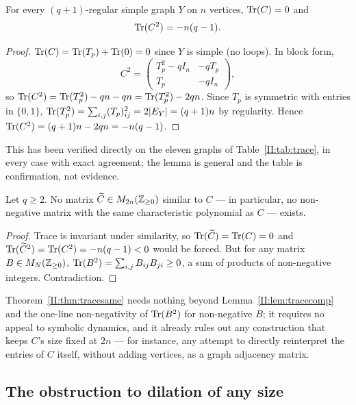 \begin{lemma}\label{II:lem:tracecomp}
For every $(q+1)$-regular simple graph $Y$ on $n$ vertices, $\operatorname{Tr}(C)=0$ and
\[
\operatorname{Tr}(C^2)=-n(q-1).
\]
\end{lemma}

\begin{proof}
$\operatorname{Tr}(C)=\operatorname{Tr}(T_p)+\operatorname{Tr}(0)=0$ since $Y$ is simple (no loops). In block form,
\[
C^2=\begin{pmatrix}T_p^2-qI_n&-qT_p\\T_p&-qI_n\end{pmatrix},
\]
so $\operatorname{Tr}(C^2)=\operatorname{Tr}(T_p^2)-qn-qn=\operatorname{Tr}(T_p^2)-2qn$. Since $T_p$ is symmetric with entries in
$\{0,1\}$, $\operatorname{Tr}(T_p^2)=\sum_{i,j}(T_p)_{ij}^2=2|E_Y|=(q+1)n$ by regularity. Hence
$\operatorname{Tr}(C^2)=(q+1)n-2qn=-n(q-1)$.
\end{proof}

This has been verified directly on the eleven graphs of Table~\ref{II:tab:trace}, in every
case with exact agreement; the lemma is general and the table is confirmation, not
evidence.

\begin{theorem}
\label{II:thm:tracesame}
Let $q\ge2$. No matrix $\widetilde C\in M_{2n}(\mathbb{Z}_{\ge0})$ similar to $C$ --- in
particular, no non-negative matrix with the same characteristic polynomial as $C$ ---
exists.
\end{theorem}

\begin{proof}
Trace is invariant under similarity, so $\operatorname{Tr}(\widetilde C)=\operatorname{Tr}(C)=0$ and
$\operatorname{Tr}(\widetilde C^2)=\operatorname{Tr}(C^2)=-n(q-1)<0$ would be forced. But for any matrix
$B\in M_N(\mathbb{Z}_{\ge0})$, $\operatorname{Tr}(B^2)=\sum_{i,j}B_{ij}B_{ji}\ge0$, a sum of products of
non-negative integers. Contradiction.
\end{proof}

\begin{remark}
Theorem~\ref{II:thm:tracesame} needs nothing beyond Lemma~\ref{II:lem:tracecomp} and the
one-line non-negativity of $\operatorname{Tr}(B^2)$ for non-negative $B$; it requires no appeal to
symbolic dynamics, and it already rules out any construction that keeps $C$'s size
fixed at $2n$ --- for instance, any attempt to directly reinterpret the entries of $C$
itself, without adding vertices, as a graph adjacency matrix.
\end{remark}

\subsection{The obstruction to dilation of any size}

